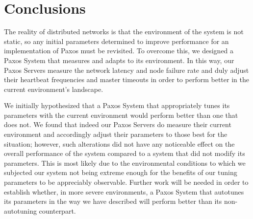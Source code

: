 
\section{Conclusions}
The reality of distributed networks is that the environment of the system is not static, so any initial parameters determined to improve performance for an implementation of Paxos must be revisited.  To overcome this, we designed a Paxos System that measures and adapts to its environment.  In this way, our Paxos Servers measure the network latency and node failure rate and duly adjust their heartbeat frequencies and master timeouts in order to perform better in the current environment's landscape.

We initially hypothesized that a Paxos System that appropriately tunes its parameters with the current environment would perform better than one that does not.  We found that indeed our Paxos Servers do measure their current environment and accordingly adjust their parameters to those best for the situation; however, such alterations did not have any noticeable effect on the overall performance of the system compared to a system that did not modify its parameters.  This is most likely due to the environmental conditions to which we subjected our system not being extreme enough for the benefits of our tuning parameters to be appreciably observable.  Further work will be needed in order to establish whether, in more severe environments, a Paxos System that autotunes its parameters in the way we have described will perform better than its non-autotuning counterpart.
